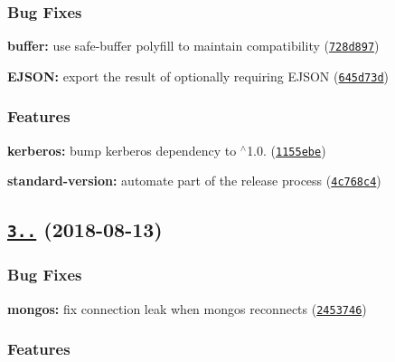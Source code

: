 \subsubsection*{Bug Fixes}


\begin{DoxyItemize}
\item {\bfseries buffer\+:} use safe-\/buffer polyfill to maintain compatibility (\href{https://github.com/mongodb-js/mongodb-core/commit/728d897}{\tt 728d897})
\item {\bfseries E\+J\+S\+ON\+:} export the result of optionally requiring E\+J\+S\+ON (\href{https://github.com/mongodb-js/mongodb-core/commit/645d73d}{\tt 645d73d})
\end{DoxyItemize}

\subsubsection*{Features}


\begin{DoxyItemize}
\item {\bfseries kerberos\+:} bump kerberos dependency to {\ttfamily $^\wedge$1.0.} (\href{https://github.com/mongodb-js/mongodb-core/commit/1155ebe}{\tt 1155ebe})
\item {\bfseries standard-\/version\+:} automate part of the release process (\href{https://github.com/mongodb-js/mongodb-core/commit/4c768c4}{\tt 4c768c4})
\end{DoxyItemize}

\label{_3.1.2}%
 \subsection*{\href{https://github.com/mongodb-js/mongodb-core/compare/v3.1.1...v3.1.2}{\tt 3..} (2018-\/08-\/13)}

\subsubsection*{Bug Fixes}


\begin{DoxyItemize}
\item {\bfseries mongos\+:} fix connection leak when mongos reconnects (\href{https://github.com/mongodb-js/mongodb-core/commit/2453746}{\tt 2453746})
\end{DoxyItemize}

\subsubsection*{Features}



